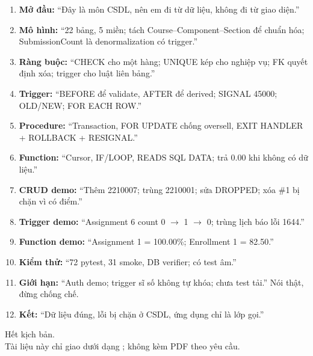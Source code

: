 \documentclass[a4paper,13pt]{extarticle}
\newcommand{\code}[1]{\texttt{\detokenize{#1}}}
\begin{document}
\begin{enumerate}
    \item \textbf{Mở đầu:} ``Đây là môn CSDL, nên em đi từ dữ liệu, không đi từ giao diện.''
    \item \textbf{Mô hình:} ``22 bảng, 5 miền; tách Course--Component--Section để chuẩn hóa; SubmissionCount là denormalization có trigger.''
    \item \textbf{Ràng buộc:} ``CHECK cho một hàng; UNIQUE kép cho nghiệp vụ; FK quyết định xóa; trigger cho luật liên bảng.''
    \item \textbf{Trigger:} ``BEFORE để validate, AFTER để derived; SIGNAL 45000; OLD/NEW; FOR EACH ROW.''
    \item \textbf{Procedure:} ``Transaction, FOR UPDATE chống oversell, EXIT HANDLER + ROLLBACK + RESIGNAL.''
    \item \textbf{Function:} ``Cursor, IF/LOOP, READS SQL DATA; trả 0.00 khi không có dữ liệu.''
    \item \textbf{CRUD demo:} ``Thêm 2210007; trùng 2210001; sửa DROPPED; xóa \#1 bị chặn vì có điểm.''
    \item \textbf{Trigger demo:} ``Assignment 6 count 0 $\to$ 1 $\to$ 0; trùng lịch báo lỗi 1644.''
    \item \textbf{Function demo:} ``Assignment 1 = 100.00\%; Enrollment 1 = 82.50.''
    \item \textbf{Kiểm thử:} ``72 pytest, 31 smoke, DB verifier; có test âm.''
    \item \textbf{Giới hạn:} ``Auth demo; trigger sĩ số không tự khóa; chưa test tải.'' Nói thật, đừng chống chế.
    \item \textbf{Kết:} ``Dữ liệu đúng, lỗi bị chặn ở CSDL, ứng dụng chỉ là lớp gọi.''
\end{enumerate}

\vfill
\begin{center}
\small
Hết kịch bản.\\
Tài liệu này chỉ giao dưới dạng \code{.tex}; không kèm PDF theo yêu cầu.
\end{center}
\end{document}
